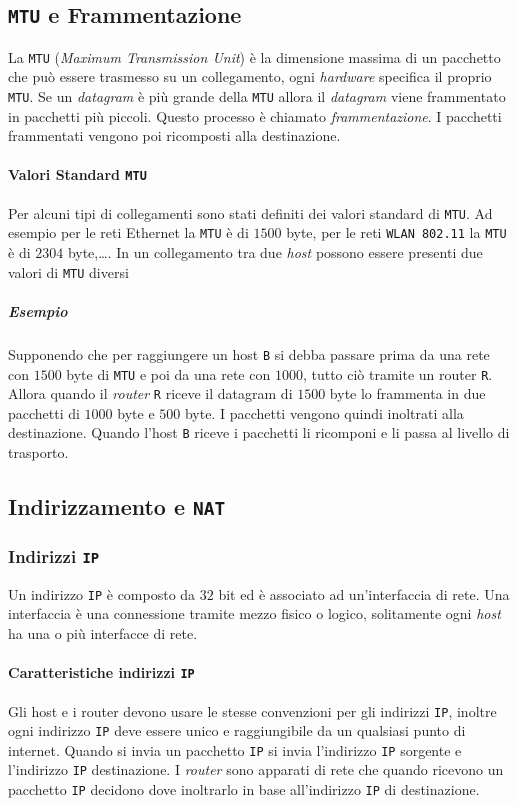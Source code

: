     \subsection{\texttt{MTU} e Frammentazione}
        La \texttt{MTU} (\textit{Maximum Transmission Unit}) è la dimensione massima di un pacchetto che può essere trasmesso su un collegamento, ogni \textit{hardware} specifica il proprio \texttt{MTU}. Se un \textit{datagram} è più grande della \texttt{MTU} allora il \textit{datagram} viene frammentato in pacchetti più piccoli. Questo processo è chiamato \textit{frammentazione}. I pacchetti frammentati vengono poi ricomposti alla destinazione.
        \paragraph{Valori Standard \texttt{MTU}} Per alcuni tipi di collegamenti sono stati definiti dei valori standard di \texttt{MTU}. Ad esempio per le reti Ethernet la \texttt{MTU} è di $1500$ byte, per le reti \texttt{WLAN 802.11} la \texttt{MTU} è di $2304$ byte,\dots. In un collegamento tra due \textit{host} possono essere presenti due valori di \texttt{MTU} diversi
        \subparagraph{Esempio} Supponendo che per raggiungere un host \texttt{B} si debba passare prima da una rete con $1500$ byte di \texttt{MTU} e poi da una rete con $1000$, tutto ciò tramite un router \texttt{R}. Allora quando il \textit{router} \texttt{R} riceve il datagram di $1500$ byte lo frammenta in due pacchetti di $1000$ byte e $500$ byte. I pacchetti vengono quindi inoltrati alla destinazione. Quando l'host \texttt{B} riceve i pacchetti li ricomponi e li passa al livello di trasporto.
        
    \subsection{Indirizzamento e \texttt{NAT}}
        \subsubsection{Indirizzi \texttt{IP}}
            Un indirizzo \texttt{IP} è composto da $32$ bit ed è associato ad un'interfaccia di rete. Una interfaccia è una connessione tramite mezzo fisico o logico, solitamente ogni \textit{host} ha una o più interfacce di rete.
            \paragraph{Caratteristiche indirizzi \texttt{IP}} Gli host e i router devono usare le stesse convenzioni per gli indirizzi \texttt{IP}, inoltre ogni indirizzo \texttt{IP} deve essere unico e raggiungibile da un qualsiasi punto di internet. Quando si invia un pacchetto \texttt{IP} si invia l'indirizzo \texttt{IP} sorgente e l'indirizzo \texttt{IP} destinazione. I \textit{router} sono apparati di rete che quando ricevono un pacchetto \texttt{IP} decidono dove inoltrarlo in base all'indirizzo \texttt{IP} di destinazione.
